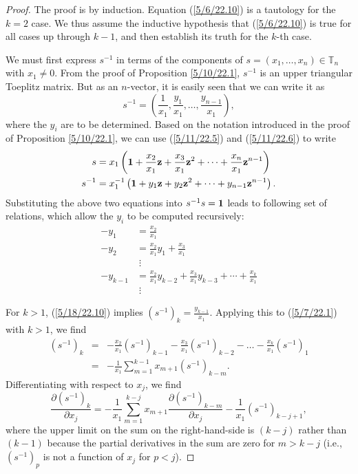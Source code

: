 \documentclass{amsart}
\numberwithin{equation}{section}
\theoremstyle{definition}
\numberwithin{theorem}{section}
\begin{document}
\begin{proof} The proof is by induction. Equation (\ref{5/6/22.10}) is a tautology for the $k=2$ case.  We thus assume the inductive hypothesis that (\ref{5/6/22.10}) is true  for all cases up through $k-1$, and then establish its truth for the $k$-th case.

We must first express $s^{-1}$ in terms of the components of  $s=(x_1,\dots,x_n)\in \mathbb{T}_n$ with $x_1\ne 0$.   From the proof of Proposition \ref{5/10/22.1},  $s^{-1}$ is an upper triangular Toeplitz matrix.  But as an $n$-vector, it is easily seen that we can write it as  \begin{equation}\label{5/9/22.1} s^{-1} = (\frac{1}{x_1}, \frac{y_1}{x_1},\dots, \frac{y_{n-1}}{x_1}),\end{equation} where the $y_i$ are to be determined. 
Based on the notation introduced in the proof of Proposition \ref{5/10/22.1}, we can use (\ref{5/11/22.5}) and (\ref{5/11/22.6}) to write
\begin{align}\nonumber s &= x_1 \left({\bf 1} + \frac{x_2}{x_1} {\bf z} + \frac{x_3}{x_1} {\bf z}^2 + \cdots + \frac{x_n}{x_1} {\bf z}^{n-1}\right)\\ s^{-1} &= x_1^{-1} \left({\bf 1} + y_1 {\bf z} + y_2 {\bf z}^2 + \cdots + y_{n-1} {\bf z}^{n-1}\right).  \label{5/18/22.10} \end{align}  Substituting the above two equations into $s^{-1} s = {\bf 1}$ leads to following set of relations, which allow the $y_i$ to be computed recursively:
\begin{align} -y_1 &= \frac{x_2}{x_1} \nonumber \\ -y_2 &= \frac{x_2}{x_1}y_1 + \frac{x_3}{x_1} \nonumber \\ &\;\vdots \nonumber \\ -y_{k-1} &= \frac{x_2}{x_1} y_{k-2} + \frac{x_3}{x_1} y_{k-3} + \cdots + \frac{x_k}{x_1} \label{5/7/22.1} \\ &\;\vdots \nonumber \end{align} 
 
 \newpage
 
 \noindent For $k>1$, (\ref{5/18/22.10}) implies  $\left( s^{-1} \right)_k = \frac{y_{k-1}}{x_1}$.  Applying this to (\ref{5/7/22.1}) with $k>1$, we find
\begin{eqnarray} \nonumber \left( s^{-1} \right)_k &=& -\frac{x_2}{x_1}\left( s^{-1} \right)_{k-1} - \frac{x_3}{x_1}\left( s^{-1} \right)_{k-2} -\dots  - \frac{x_k}{x_1}\left( s^{-1} \right)_1 \\ &=& -\frac{1}{x_1}\sum_{m=1}^{k-1} x_{m+1}\left( s^{-1} \right)_{k-m}. \label{5/7/22.2}\end{eqnarray}
Differentiating with respect to $x_j$, we find \begin{equation}  \frac{\partial \left( s^{-1} \right)_k}{\partial x_j} = -\frac{1}{x_1} \sum_{m=1}^{k-j} x_{m+1} \frac{\partial \left( s^{-1} \right)_{k-m}}{\partial x_j} -  \frac{1}{x_1}\left( s^{-1} \right)_{k-j+1} \label{5/7/22.4}, \end{equation} where the upper limit on the sum on the right-hand-side is $(k-j)$ rather than $(k-1)$ because the partial derivatives in the sum are zero for $m> k-j$ (i.e., $\left( s^{-1} \right)_p$ is not a function of $x_j$ for $p<j$).  


\end{proof}
\end{document}
